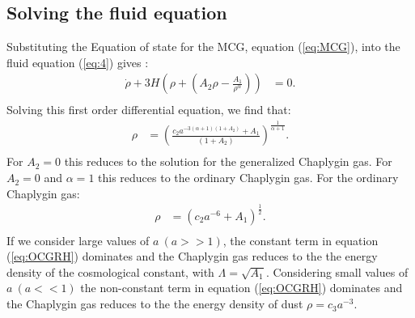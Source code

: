 \documentclass[a4paper, 11pt]{FSKH_623_Report}
\numberwithin{equation}{section}
\newcommand{\brac}[1]{\left(#1\right)}
\begin{document}
\subsection*{Solving the fluid equation}
Substituting the Equation of state for the MCG, equation (\ref{eq:MCG}), into the fluid equation (\ref{eq:4}) gives :
\begin{equation}\label{eq:FMCG0}
\begin{split}
\dot{\rho}+3H\brac{\rho+\brac{A_{2}\rho-\frac{A_{1}}{\rho^{\alpha}}}} &= 0. \\
\end{split}
\end{equation}
Solving this first order differential equation, we find that:
\begin{equation}\label{eq:FMCG}
\begin{split}
\rho&=\brac{\frac{c_{2}a^{-3\brac{\alpha+1}\brac{1+A_{2}}}+A_{1}}{\brac{1+A_{2}}}}^{\frac{1}{\alpha+1}}.\\ \end{split} \end{equation} 
For $A_{2}=0$ this reduces to the solution for the generalized Chaplygin gas. For $A_{2}=0$ and $\alpha=1$ this reduces to the ordinary Chaplygin gas.
For the ordinary Chaplygin gas:
\begin{equation}\label{eq:OCGRH}
\begin{split}
\rho&=\brac{c_{2}a^{-6}+A_{1}}^{\frac{1}{2}}.\\
\end{split}
\end{equation}
If we consider large values of $a\ \brac{a>>1}$, the constant term in equation (\ref{eq:OCGRH}) dominates and the Chaplygin gas reduces to the the energy density of the cosmological constant, with $\Lambda=\sqrt{A_{1}}$. Considering small values of $a\ \brac{a<<1}$ the non-constant term in equation (\ref{eq:OCGRH}) dominates and the Chaplygin gas reduces to the the energy density of dust $\rho=c_{3}a^{-3}$.
\end{document}
